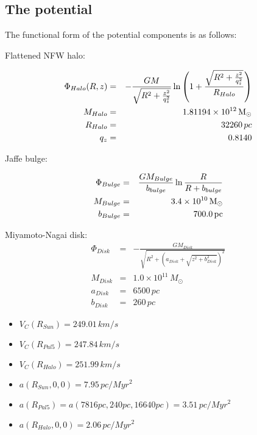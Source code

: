 \subsection{The potential}\label{ssec:potential}

The functional form of the potential components is as follows:

Flattened NFW halo:

\begin{eqnarray}
  \Phi_{Halo}(R, z) &=& -\frac{GM}{\sqrt{R^2+\frac{z^2}{q_z^2}}}\ln\left(1+\frac{\sqrt{R^2+\frac{z^2}{q_z^2}}}{R_{Halo}} \right)\\
  M_{Halo} &=& 1.81194\times 10^{12}\mbox{$\,{\rm M}_\odot$}\\
  R_{Halo} &=& 32260\,pc\\
  q_z &=& 0.8140
\end{eqnarray}

Jaffe bulge:

\begin{eqnarray}
  \Phi_{Bulge} &=& \frac{GM_{Bulge}}{b_{bulge}}\ln{\frac{R}{R+b_{bulge}}}\\
  M_{Bulge} &=& 3.4\times 10^{10}\mbox{$\,{\rm M}_\odot$}\\
  b_{Bulge} &=& 700.0\,\mbox{pc}
\end{eqnarray}

Miyamoto-Nagai disk:
\begin{eqnarray}
  \Phi_{Disk} &=& -\frac{GM_{Disk}}{\sqrt{R^2+\left(a_{Disk}+\sqrt{z^2+b_{Disk}^2}\right)^2}}\\
  M_{Disk} &=& 1.0\times 10^{11}\,M_{\odot}\\
  a_{Disk} &=& 6500\,pc\\
  b_{Disk} &=& 260\,pc
\end{eqnarray}

\begin{itemize}
  \item $V_C(R_{Sun}) = 249.01\,km/s$
  \item $V_C(R_{Pal5}) = 247.84\,km/s$
  \item $V_C(R_{Halo}) = 251.99\,km/s$
  \item $a(R_{Sun}, 0, 0) = 7.95\,pc/Myr^2$
  \item $a(R_{Pal5}) = a(7816 pc, 240 pc, 16640 pc) = 3.51\,pc/Myr^2$
  \item $a(R_{Halo}, 0, 0) = 2.06\,pc/Myr^2$
\end{itemize}



